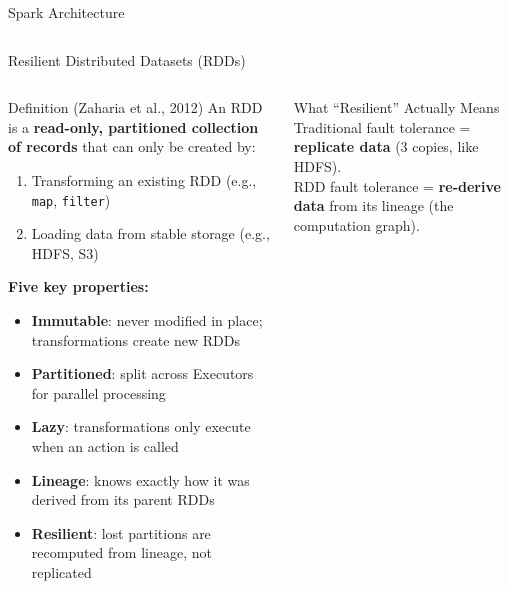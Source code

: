 \documentclass[aspectratio=169,10pt]{beamer}
\begin{document}
\begin{frame}{Spark Architecture}
\begin{columns}[T]
\begin{center}
      \end{center}
  \end{columns}
\end{frame}

\begin{frame}{Resilient Distributed Datasets (RDDs)}
  \begin{columns}[T]
      \begin{block}{Definition (Zaharia et al., 2012)}
        An RDD is a \textbf{read-only, partitioned collection of records} that can only be created by:
        \begin{enumerate}
          \item Transforming an existing RDD (e.g., \texttt{map}, \texttt{filter})
          \item Loading data from stable storage (e.g., HDFS, S3)
        \end{enumerate}
        \vspace{4pt}
        \textbf{Five key properties:}
        \begin{itemize}
          \item \textbf{Immutable}: never modified in place; transformations create new RDDs
          \item \textbf{Partitioned}: split across Executors for parallel processing
          \item \textbf{Lazy}: transformations only execute when an action is called
          \item \textbf{Lineage}: knows exactly how it was derived from its parent RDDs
          \item \textbf{Resilient}: lost partitions are recomputed from lineage, not replicated
        \end{itemize}
      \end{block}

      \begin{exampleblock}{What ``Resilient'' Actually Means}
        \small Traditional fault tolerance = \textbf{replicate data} (3 copies, like HDFS).\\
        RDD fault tolerance = \textbf{re-derive data} from its lineage (the computation graph).
        \vspace{6pt}


\end{exampleblock}
\end{columns}
\end{frame}
\end{document}
